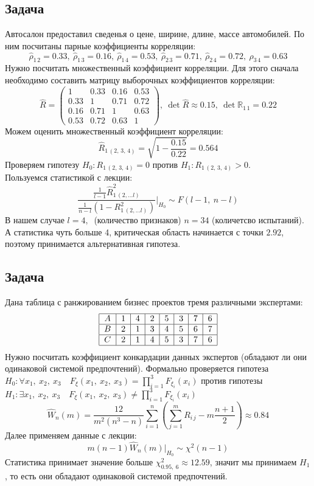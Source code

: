 \documentclass[12pt, a4paper]{article}
\begin{document}
\subsection*{Задача}
Автосалон предоставил сведенья о цене, ширине, длине, массе автомобилей. По ним посчитаны парные коэффициенты корреляции:
\[\hat \rho_{1\, 2} = 0.33,\ \hat \rho_{1\, 3} = 0.16,\ \hat \rho_{1\, 4} = 0.53,\ \hat\rho_{2\, 3} = 0.71,\ \hat\rho_{2\, 4} = 0.72,\ \hat \rho_{3\, 4} = 0.63\]
Нужно посчитать множественный коэффициент корреляции. Для этого сначала необходимо составить матрицу выборочных коэффициентов корреляции:
\[
\hat R = \begin{pmatrix}
    1 & 0.33 & 0.16 & 0.53\\
    0.33 & 1 & 0.71 & 0.72\\
    0.16 & 0.71 & 1 & 0.63\\
    0.53 & 0.72 & 0.63 & 1
\end{pmatrix},\ \det \hat R \approx 0.15,\ \det \mathbb{R}_{1\, 1} = 0.22
\]
Можем оценить множественный коэффициент корреляции:
\[
\hat R_{1\, (2,\, 3,\, 4)} = \sqrt{1 - \frac{0.15}{0.22}} = 0.564
\]
Проверяем гипотезу $H_0: R_{1\, (2,\, 3,\, 4)} = 0$ против $H_1: R_{1\, (2,\, 3,\, 4)} > 0$.\\
Пользуемся статистикой с лекции:
\[
\frac{\frac{1}{l - 1} \hat R^2_{1\, (2,\dots l)}}{\frac{1}{n - l} \left( 1 - R^2_{1\, (2,\dots l)} \right)} \Bigg|_{H_0} \sim F(l - 1,\ n - l)
\]
В нашем случае $l = 4,\ $ (количество признаков) $n = 34$ (количетсво испытаний). А статистика чуть больше 4, критическая область начинается с точки $2.92$, поэтому принимается альтернативная гипотеза.
\subsection*{Задача}
Дана таблица с ранжированием бизнес проектов тремя различными экспертами:
\[
\begin{tabular}{|c|c|c|c|c|c|c|c|}
    \hline
    $A$ & 1 & 4 & 2 & 5 & 3 & 7 & 6\\
    \hline
    $B$ & 2 & 1 & 3 & 4 & 5 & 6 & 7\\
    \hline
    $C$ & 2 & 1 & 4 & 5 & 3 & 7 & 6\\
    \hline
\end{tabular}
\]
Нужно посчитать коэффициент конкардации данных экспертов (обладают ли они одинаковой системой предпочтений). Формально проверяется гипотеза $\displaystyle H_0: \forall x_1,\ x_2,\ x_3\quad  F_{\xi} (x_1,\ x_2,\ x_3) = \prod_{i = 1}^{3} F_{\xi_i}(x_i)$ против гипотезы $\displaystyle H_1: \exists x_1,\ x_2,\ x_3\quad F_{\xi} (x_1,\ x_2,\ x_3) \neq \prod_{i = 1}^{3} F_{\xi_i}(x_i)$\\
\[
\hat W_n(m) = \frac{12}{m^2(n^3 - n)} \sum_{i = 1}^{n} \left( \sum_{j = 1}^{m} R_{i\, j} - m\frac{n + 1}{2} \right) \approx 0.84
\]
Далее применяем данные с лекции:
\[
m(n - 1) \hat W_n(m) \Big|_{H_0} \sim \chi^2(n - 1)
\]
Статистика принимает значение больше $\chi^2_{0.95,\ 6} \approx 12.59$, значит мы принимаем $H_1$, то есть они обладают одинаковой системой предпочтений.
\end{document}

